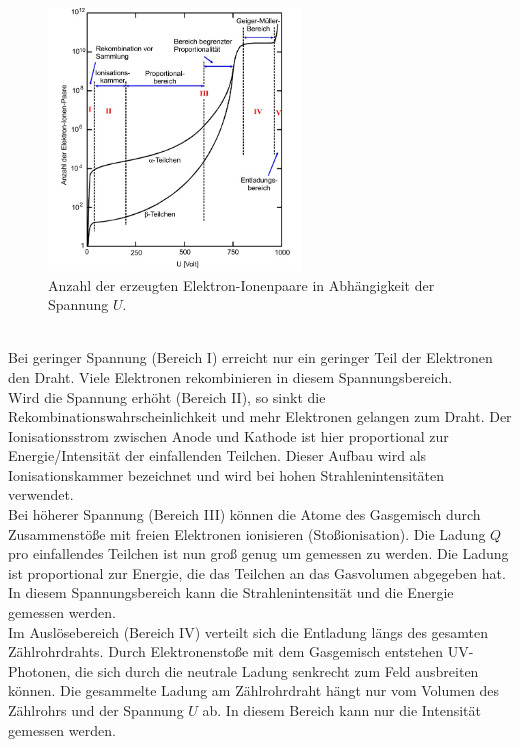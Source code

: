\begin{figure}
    \centering
    \includegraphics[width=0.6\textwidth]{content/data/spannung.jpg}
    \caption{Anzahl der erzeugten Elektron-Ionenpaare in Abhängigkeit der Spannung $U$. \cite[2]{anleitung}}
    \label{fig:spannung}
\end{figure}
\\
Bei geringer Spannung (Bereich I) erreicht nur ein geringer Teil der Elektronen den Draht.
Viele Elektronen rekombinieren in diesem Spannungsbereich.
\\
Wird die Spannung erhöht (Bereich II), so sinkt die Rekombinationswahrscheinlichkeit und mehr Elektronen gelangen zum Draht.
Der Ionisationsstrom zwischen Anode und Kathode ist hier proportional zur Energie/Intensität der einfallenden Teilchen.
Dieser Aufbau wird als Ionisationskammer bezeichnet und wird bei hohen Strahlenintensitäten verwendet.
\\
Bei höherer Spannung (Bereich III) können die Atome des Gasgemisch durch Zusammenstöße mit freien Elektronen ionisieren (Stoßionisation).
Die Ladung $Q$ pro einfallendes Teilchen ist nun groß genug um gemessen zu werden.
Die Ladung ist proportional zur Energie, die das Teilchen an das Gasvolumen abgegeben hat.
In diesem Spannungsbereich kann die Strahlenintensität und die Energie gemessen werden.
\\
Im Auslösebereich (Bereich IV) verteilt sich die Entladung längs des gesamten Zählrohrdrahts.
Durch Elektronenstoße mit dem Gasgemisch entstehen UV-Photonen, die sich durch die neutrale Ladung senkrecht zum Feld ausbreiten können.
Die gesammelte Ladung am Zählrohrdraht hängt nur vom Volumen des Zählrohrs und der Spannung $U$ ab.
In diesem Bereich kann nur die Intensität gemessen werden.

